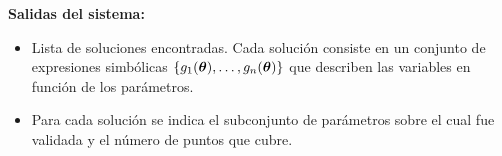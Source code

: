 \documentclass{article} \usepackage[utf8]{inputenc} \usepackage[spanish]{babel} \usepackage{amsmath, amssymb, amsthm} \usepackage{bm} \usepackage{float} \usepackage{longtable} \usepackage[hidelinks]{hyperref}
\begin{document}
\textbf{Salidas del sistema:} \begin{itemize} \item Lista de soluciones encontradas. Cada solución consiste en un conjunto de expresiones simbólicas \(\{g_1(\boldsymbol{\theta}), \dots, g_n(\boldsymbol{\theta})\}\) que describen las variables en función de los parámetros. \item Para cada solución se indica el subconjunto de parámetros sobre el cual fue validada y el número de puntos que cubre. \end{itemize}


\newpage   
\end{document}
